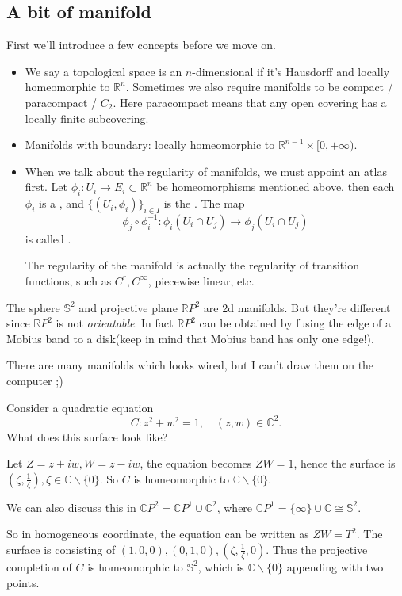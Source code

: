 \subsection{A bit of manifold}
\label{sub:Intro}

First we'll introduce a few concepts before we move on.
\begin{itemize}
	\item We say a topological space is an $n$-dimensional 
	if it's Hausdorff and locally homeomorphic to $\mathbb{R}^{n}$.
	Sometimes we also require manifolds to be compact / paracompact / $C_2$.
	Here paracompact means that any open covering has a locally finite subcovering.

	\item Manifolds with boundary:
		locally homeomorphic to $\mathbb{R}^{n-1}\times [0, +\infty)$.

	\item When we talk about the regularity of manifolds, we must
		appoint an atlas first.
		Let $\phi_i: U_i \to E_i \subset \mathbb{R}^{n}$ be
		homeomorphisms mentioned above,
		then each $\phi_i$ is a , and $\{(U_i, \phi_i)\}_{i\in I}$ is
		the . The map
		\[
			\phi_j\circ\phi_i^{-1}: \phi_i(U_i\cap U_j)\to \phi_j(U_i\cap U_j)
		\]
		is called .

		The regularity of the manifold is actually the regularity of
		transition functions, such as $C^r, C^\infty$, piecewise linear, etc.
\end{itemize}
\begin{example}
    The sphere $\mathbb{S}^2$ and projective plane $\mathbb{R}P^2$ are 2d manifolds.
	But they're different since $\mathbb{R}P^2$ is not \textit{orientable}.
	In fact $\mathbb{R}P^2$ can be obtained by fusing the edge of a Mobius band
	to a disk(keep in mind that Mobius band has only one edge!).
\end{example}
There are many manifolds which looks wired, but I can't draw them on the computer ;)

\begin{example}
    Consider a quadratic equation
	\[
	C: z^2 + w^2 = 1,\quad (z, w)\in \mathbb{C}^2.
	\]
	What does this surface look like?

	Let $Z = z+iw, W = z-iw$, the equation becomes $ZW = 1$,
	hence the surface is $(\zeta, \frac{1}{\zeta}), \zeta\in \mathbb{C}\backslash\{0\}$.
	So $C$ is homeomorphic to $\mathbb{C}\backslash\{0\}$.

	We can also discuss this in $\mathbb{C}P^2 = \mathbb{C}P^1 \cup \mathbb{C}^2$,
	where $\mathbb{C}P^1 = \{\infty\} \cup \mathbb{C}\cong \mathbb{S}^2$.

	So in homogeneous coordinate, the equation can be written as $ZW = T^2$.
	The surface is consisting of $(1,0,0), (0,1,0), (\zeta, \frac{1}{\zeta}, 0)$.
	Thus the projective completion of $C$ is homeomorphic
	to $\mathbb{S}^2$, which is $\mathbb{C}\backslash\{0\}$
	appending with two points.
\end{example}

